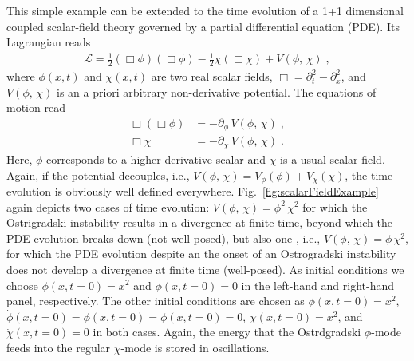 \documentclass[a4paper,oneside,openany,11pt]{memoir}
\numberwithin{equation}{section} %
\begin{document}
This simple example can be extended to the time evolution of a 1+1 dimensional coupled scalar-field theory governed by a partial differential equation (PDE). Its Lagrangian reads
\begin{align}
    \mathcal{L} = \frac{1}{2}\left(\Box \phi\right)\left(\Box \phi\right) - \frac{1}{2}\chi\left(\Box \chi\right) + V(\phi,\,\chi)\;,
\end{align}
where $\phi(x,t)$ and $\chi(x,t)$ are two real scalar fields, $\Box = \partial_t^2 - \partial_x^2$, and $V(\phi,\,\chi)$ is an a priori arbitrary non-derivative potential. The equations of motion read
\begin{align}
\label{eq:eoms_scalarFieldExample}
    \Box\left(\Box \phi\right) &= -\partial_\phi\,V(\phi,\,\chi)\;,\\
    \Box \chi &= -\partial_\chi\,V(\phi,\,\chi)\;.
\end{align}
Here, $\phi$ corresponds to a higher-derivative scalar and $\chi$ is a usual scalar field. Again, if the potential decouples, i.e., $V(\phi,\,\chi) = V_\phi(\phi) + V_\chi(\chi)$, the time evolution is obviously well defined everywhere.
Fig.~\ref{fig:scalarFieldExample} again depicts two cases of time evolution: $V(\phi,\,\chi) = \phi^2\,\chi^2$ for which the Ostrigradski instability results in a divergence at finite time, beyond which the PDE evolution breaks down (not well-posed), but also one , i.e., $V(\phi,\,\chi) = \phi\,\chi^2$, for which the PDE evolution despite an the onset of an Ostrogradski instability does not develop a divergence at finite time (well-posed). As initial conditions we choose $\phi(x,t=0)= x^2$ and $\phi(x,t=0)= 0$ in the left-hand and right-hand panel, respectively. The other initial conditions are chosen as $\phi(x,t=0)= x^2$, $\dot{\phi}(x,t=0) = \ddot{\phi}(x,t=0) = \dddot{\phi}(x,t=0) = 0$, $\chi(x,t=0)= x^2$, and $\dot{\chi}(x,t=0)=0$ in both cases. Again, the energy that the Ostrdgradski $\phi$-mode feeds into the regular $\chi$-mode is stored in oscillations.
\\
\end{document}
